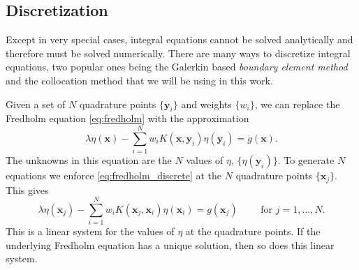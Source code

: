 \subsection{Discretization}\label{sec:discretization}

Except in very special cases, integral equations cannot be solved analytically and therefore must be solved numerically.  There are many ways to  discretize  integral equations, two popular ones being the Galerkin based \textit{boundary element method} \cite{Brebbia1977} and the collocation method that we will be using in this work.

Given a set of $N$ quadrature points $\{\mathbf{y}_i\}$ and weights $\{w_i\}$, we can replace the Fredholm equation \eqref{eq:fredholm} with the approximation
\begin{equation}\label{eq:fredholm_discrete} \lambda\eta(\mathbf{x}) - \sum\limits_{i=1}^N w_i K(\mathbf{x}, \mathbf{y}_i)\eta(\mathbf{y}_i) = g(\mathbf{x}).\end{equation}
The unknowns in this equation are the $N$ values of $\eta$, $\{\eta(\mathbf{y}_i)\}$. To generate $N$ equations we enforce \eqref{eq:fredholm_discrete} at the $N$ quadrature points $\{\mathbf{x}_j\}$. This gives
\[ \lambda\eta(\mathbf{x}_j) - \sum\limits_{i=1}^N w_i K(\mathbf{x}_j, \mathbf{x}_i)\eta(\mathbf{x}_i) = g(\mathbf{x}_j) \qquad \text{ for } j = 1,\hdots, N.\]
This is a linear system for the values of $\eta$ at the quadrature points. If the underlying Fredholm  equation has a unique solution, then so does this linear system. 

